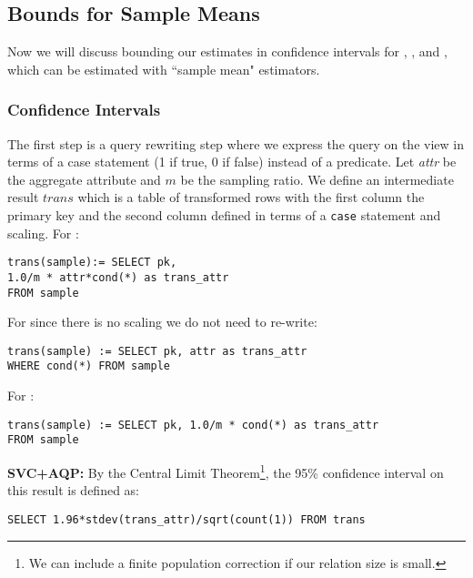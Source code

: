\subsection{Bounds for Sample Means}
Now we will discuss bounding our estimates in confidence intervals for \sumfunc, \countfunc, and \avgfunc, which can be
estimated with ``sample mean" estimators.

\subsubsection{Confidence Intervals}

The first step is a query rewriting step where we express the query on the view in terms of a \textsf{case} statement (1 if true, 0 if false)
instead of a predicate.
Let \emph{attr} be the aggregate attribute and $m$ be the sampling ratio. 
We define an intermediate result $trans$ which is a table of transformed rows with the first column the 
primary key and the second column defined in terms of a \texttt{case} statement and scaling.
For \sumfunc: 
\begin{lstlisting}[mathescape,basicstyle={\scriptsize}]
trans(sample):= SELECT pk, 
1.0/m * attr*cond(*) as trans_attr
FROM sample 
\end{lstlisting} 
For \avgfunc since there is no scaling we do not need to re-write:
\begin{lstlisting}[mathescape,basicstyle={\scriptsize}]
trans(sample) := SELECT pk, attr as trans_attr 
WHERE cond(*) FROM sample
\end{lstlisting}
For \countfunc:
\begin{lstlisting}[mathescape,basicstyle={\scriptsize}]
trans(sample) := SELECT pk, 1.0/m * cond(*) as trans_attr
FROM sample
\end{lstlisting}

\vspace{0.25em}

\noindent\textbf{SVC+AQP: } By the Central Limit Theorem\footnote{We can include a finite population correction if our relation size is small.}, the 95\% confidence interval on this result is defined 
as:
\begin{lstlisting}[mathescape,basicstyle={\scriptsize}]
SELECT 1.96*stdev(trans_attr)/sqrt(count(1)) FROM trans
\end{lstlisting}

